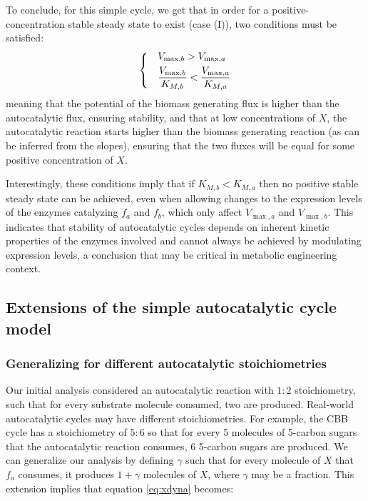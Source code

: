     To conclude, for this simple cycle, we get that in order for a positive-concentration stable steady state to exist (case (I)), two conditions must be satisfied:
    \begin{equation}
    \label{eq:stabconds}
    \begin{dcases}
      & V_{\max,b}>V_{\max,a} \\
      & \frac{V_{\max,b}}{K_{M,b}}<\frac{V_{\max,a}}{K_{M,a}}
    \end{dcases}
    \end{equation}
    meaning that the potential of the biomass generating flux is higher than the autocatalytic flux, ensuring stability, and that at low concentrations of $X$, the autocatalytic reaction starts higher than the biomass generating reaction (as can be inferred from the slopes), ensuring that the two fluxes will be equal for some positive concentration of $X$.

    Interestingly, these conditions imply that if $K_{M,b}<K_{M,a}$ then no positive stable steady state can be achieved, even when allowing changes to the expression levels of the enzymes catalyzing $f_a$ and $f_b$, which only affect $V_{\max,a}$ and $V_{\max,b}$.
    This indicates that stability of autocatalytic cycles depends on inherent kinetic properties of the enzymes involved and cannot always be achieved by modulating expression levels, a conclusion that may be critical in metabolic engineering context.
\subsection{Extensions of the simple autocatalytic cycle model}
    \subsubsection{Generalizing for different autocatalytic stoichiometries}
    Our initial analysis considered an autocatalytic reaction with $1:2$ stoichiometry, such that for every substrate molecule consumed, two are produced.
    Real-world autocatalytic cycles may have different stoichiometries.
    For example, the CBB cycle has a stoichiometry of $5:6$ so that for every 5 molecules of 5-carbon sugars that the autocatalytic reaction consumes, 6 5-carbon sugars are produced.
    We can generalize our analysis by defining $\gamma$ such that for every molecule of $X$ that $f_a$ consumes, it produces $1+\gamma$ molecules of $X$, where $\gamma$ may be a fraction.
    This extension implies that equation \eqref{eq:xdyna} becomes:

